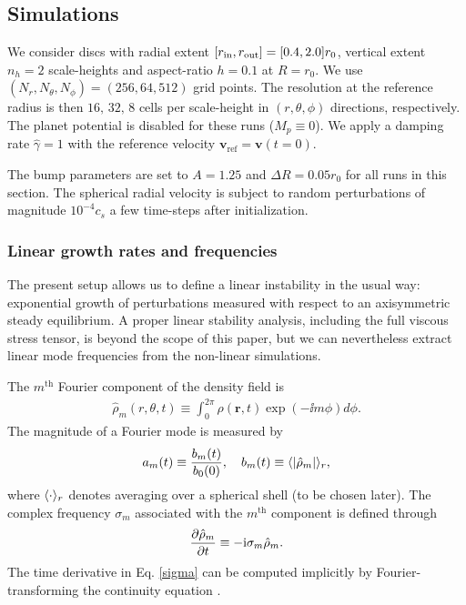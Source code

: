 \subsection{Simulations}
We consider discs with radial extent $[r_\mathrm{in},r_\mathrm{out}]=[0.4,2.0]r_0$,
vertical extent $n_h=2$ scale-heights and aspect-ratio $h=0.1$ at
$R=r_0$. We use $(N_r, N_\theta,
N_\phi)=(256,64,512)$ grid points. 
The resolution at the reference radius is then
$16,\,32,\,8$ cells per scale-height in $(r,\theta,\phi)$ directions,
respectively. The planet potential is disabled for these runs
($M_p\equiv 0$). We apply a damping rate $\hat{\gamma}=1$ with the
reference velocity $\bm{v}_\mathrm{ref}=\bm{v}(t=0)$.     

The bump parameters are set to $A=1.25$ and $\Delta R = 0.05r_0$ for
all runs in this section. The spherical radial velocity is subject 
to random perturbations of magnitude $10^{-4}c_s$ 
a few time-steps after initialization. 



\subsubsection{Linear growth rates and frequencies}
The present setup allows us to define a linear instability in the
usual way: exponential growth of perturbations measured with respect
to an axisymmetric steady equilibrium. A proper linear
stability analysis, including the full viscous stress tensor, is
beyond the scope of this paper, but we can nevertheless extract linear 
mode frequencies from the non-linear simulations.  

The $m^\mathrm{th}$ Fourier component of the density field is  
\begin{align}
\hat{\rho}_m(r,\theta,t) \equiv \int_0^{2\pi} \rho(\bm{r},t)\exp{(-\ii
  m\phi)}d\phi. 
\end{align} 
The magnitude of a Fourier mode is measured by 
\begin{align} 
a_m(t)\equiv \frac{b_m(t)}{b_0(0)},\quad b_m(t)\equiv \langle |\hat{\rho}_m| \rangle_r,
\end{align} 
where $\langle \cdot \rangle_r$ denotes averaging over a spherical shell (to be
chosen later). 
The complex frequency $\sigma_m$ associated with the $m^\mathrm{th}$ component 
is defined through 
\begin{align}\label{sigma}
  \frac{\partial\hat{\rho}_m}{\partial t} \equiv -\mathrm{i}\sigma_m\hat{\rho}_m. 
\end{align}
The time derivative in Eq. \ref{sigma} can be computed implicitly by 
Fourier-transforming the continuity equation \citep[as done
  in][]{lin13}. 

